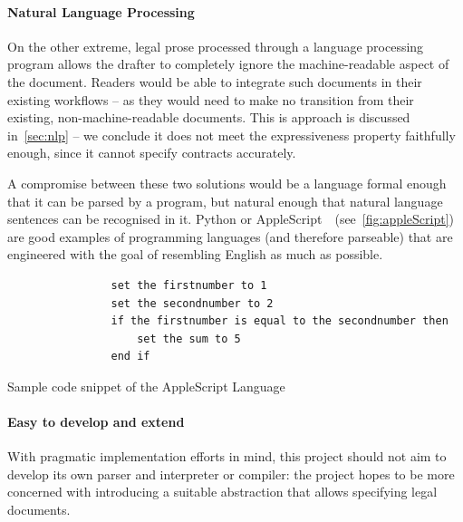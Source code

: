 \paragraph{Natural Language Processing}

On the other extreme, legal prose processed through a language processing program allows the drafter to completely ignore the machine-readable aspect of the document.
Readers would be able to integrate such documents in their existing workflows -- as they would need to make no transition from their existing, non-machine-readable documents.
This is approach is discussed in~\autoref{sec:nlp} -- we conclude it does not meet the expressiveness property faithfully enough, since it cannot specify contracts accurately.

A compromise between these two solutions would be a language formal enough that it can be parsed by a program, but natural enough that natural language sentences can be recognised in it.
Python or AppleScript~\cite{Sanderson2010appleScript}~(see~\autoref{fig:appleScript}) are good examples of programming languages (and therefore parseable) that are engineered with the goal of resembling English as much as possible.

\begin{listing}[h]
    \centering
    \begin{minipage}{0.7\textwidth}
        \begin{verbatim}
                set the firstnumber to 1
                set the secondnumber to 2
                if the firstnumber is equal to the secondnumber then
                    set the sum to 5
                end if
        \end{verbatim}
    \end{minipage}
    \caption{Sample code snippet of the AppleScript Language~\cite{Sanderson2010appleScript}}
    \label{fig:appleScript}
\end{listing}

\paragraph{Easy to develop and extend}

With pragmatic implementation efforts in mind, this project should not aim to develop its own parser and interpreter or compiler: the project hopes to be more concerned with introducing a suitable abstraction that allows specifying legal documents.

